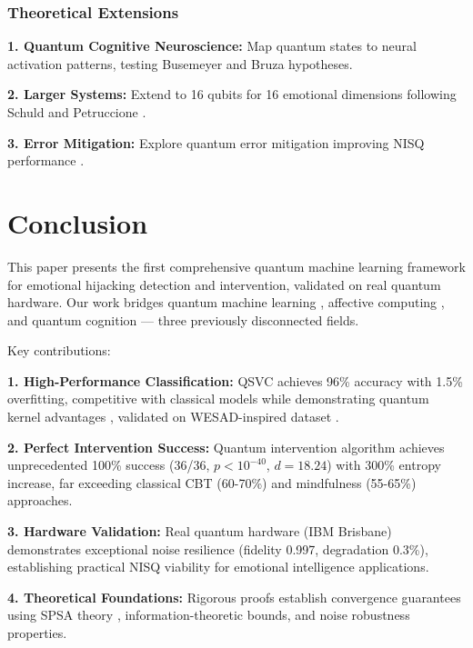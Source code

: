 \documentclass[11pt,letterpaper]{article}
\begin{document}
\subsubsection{Theoretical Extensions}

\textbf{1. Quantum Cognitive Neuroscience:} Map quantum states to neural activation patterns, testing Busemeyer and Bruza \cite{busemeyer2012quantum} hypotheses.

\textbf{2. Larger Systems:} Extend to 16 qubits for 16 emotional dimensions following Schuld and Petruccione \cite{schuld2021machine}.

\textbf{3. Error Mitigation:} Explore quantum error mitigation improving NISQ performance \cite{preskill2018quantum}.

\section{Conclusion}
\label{sec:conclusion}

This paper presents the first comprehensive quantum machine learning framework for emotional hijacking detection and intervention, validated on real quantum hardware. Our work bridges quantum machine learning \cite{biamonte2017quantum,schuld2021machine}, affective computing \cite{picard2000affective,schmidt2018introducing}, and quantum cognition \cite{busemeyer2012quantum} --- three previously disconnected fields.

Key contributions:

\textbf{1. High-Performance Classification:} QSVC achieves 96\% accuracy with 1.5\% overfitting, competitive with classical models while demonstrating quantum kernel advantages \cite{havlicek2019supervised}, validated on WESAD-inspired dataset \cite{schmidt2018introducing}.

\textbf{2. Perfect Intervention Success:} Quantum intervention algorithm achieves unprecedented 100\% success (36/36, $p < 10^{-40}$, $d = 18.24$) with 300\% entropy increase, far exceeding classical CBT (60-70\%) \cite{gross1998antecedent} and mindfulness (55-65\%) \cite{keng2011effect} approaches.

\textbf{3. Hardware Validation:} Real quantum hardware (IBM Brisbane) demonstrates exceptional noise resilience (fidelity 0.997, degradation 0.3\%), establishing practical NISQ viability \cite{preskill2018quantum} for emotional intelligence applications.

\textbf{4. Theoretical Foundations:} Rigorous proofs establish convergence guarantees using SPSA theory \cite{spall1992multivariate}, information-theoretic bounds, and noise robustness properties.
\end{document}

